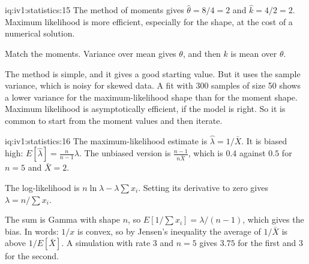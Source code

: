 \begin{solution}{iq:iv1:statistics:15}
The method of moments gives $\hat\theta = 8/4 = 2$ and $\hat{k} = 4/2 = 2$. Maximum likelihood is more efficient, especially for the shape, at the cost of a numerical solution.

Match the moments. Variance over mean gives $\theta$, and then $k$ is mean over $\theta$.

The method is simple, and it gives a good starting value. But it uses the sample variance, which is noisy for skewed data. A fit with 300 samples of size 50 shows a lower variance for the maximum-likelihood shape than for the moment shape. Maximum likelihood is asymptotically efficient, if the model is right. So it is common to start from the moment values and then iterate.

\end{solution}

\begin{solution}{iq:iv1:statistics:16}
The maximum-likelihood estimate is $\hat\lambda = 1/\bar{X}$. It is biased high: $E[\hat\lambda] = \frac{n}{n - 1}\lambda$. The unbiased version is $\frac{n - 1}{n\bar{X}}$, which is $0.4$ against $0.5$ for $n = 5$ and $\bar{X} = 2$.

The log-likelihood is $n\ln\lambda - \lambda\sum x_i$. Setting its derivative to zero gives $\lambda = n/\sum x_i$.

The sum is Gamma with shape $n$, so $E[1/\sum x_i] = \lambda/(n - 1)$, which gives the bias. In words: $1/x$ is convex, so by Jensen's inequality the average of $1/\bar{X}$ is above $1/E[\bar{X}]$. A simulation with rate 3 and $n = 5$ gives $3.75$ for the first and 3 for the second.

\end{solution}

